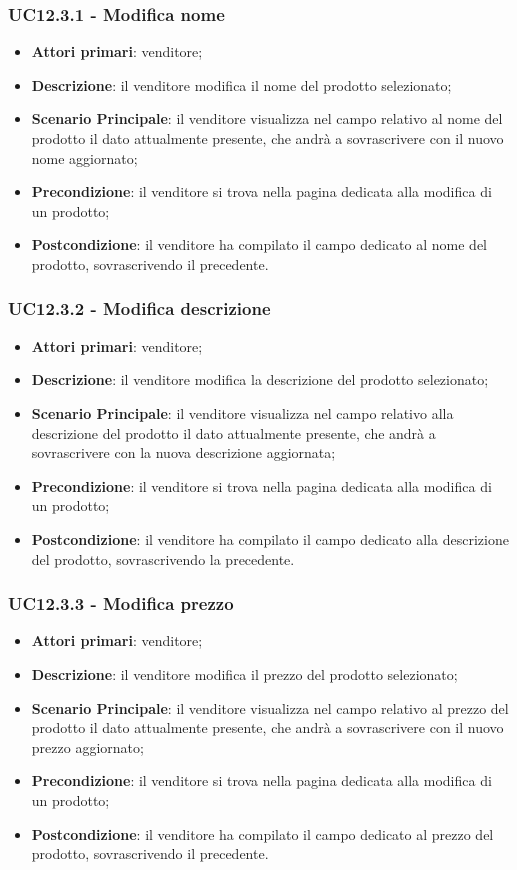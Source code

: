 \subsubsection{UC12.3.1 - Modifica nome}
\begin{itemize}
\item \textbf{Attori primari}: venditore;
\item \textbf{Descrizione}: il venditore modifica il nome del prodotto selezionato;
\item \textbf{Scenario Principale}: il venditore visualizza nel campo relativo al nome del prodotto il dato attualmente presente, che andrà a sovrascrivere con il nuovo nome aggiornato;
\item \textbf{Precondizione}: il venditore si trova nella pagina dedicata alla modifica di un prodotto;
\item \textbf{Postcondizione}: il venditore ha compilato il campo dedicato al nome del prodotto, sovrascrivendo il precedente.
\end{itemize}

\subsubsection{UC12.3.2 - Modifica descrizione}
\begin{itemize}
\item \textbf{Attori primari}: venditore;
\item \textbf{Descrizione}: il venditore modifica la descrizione del prodotto selezionato;
\item \textbf{Scenario Principale}: il venditore visualizza nel campo relativo alla descrizione del prodotto il dato attualmente presente, che andrà a sovrascrivere con la nuova descrizione aggiornata;
\item \textbf{Precondizione}: il venditore si trova nella pagina dedicata alla modifica di un prodotto;
\item \textbf{Postcondizione}: il venditore ha compilato il campo dedicato alla descrizione del prodotto, sovrascrivendo la precedente.
\end{itemize}

\subsubsection{UC12.3.3 - Modifica prezzo}
\begin{itemize}
\item \textbf{Attori primari}: venditore;
\item \textbf{Descrizione}: il venditore modifica il prezzo del prodotto selezionato;
\item \textbf{Scenario Principale}: il venditore visualizza nel campo relativo al prezzo del prodotto il dato attualmente presente, che andrà a sovrascrivere con il nuovo prezzo aggiornato;
\item \textbf{Precondizione}: il venditore si trova nella pagina dedicata alla modifica di un prodotto;
\item \textbf{Postcondizione}: il venditore ha compilato il campo dedicato al prezzo del prodotto, sovrascrivendo il precedente.
\end{itemize}

